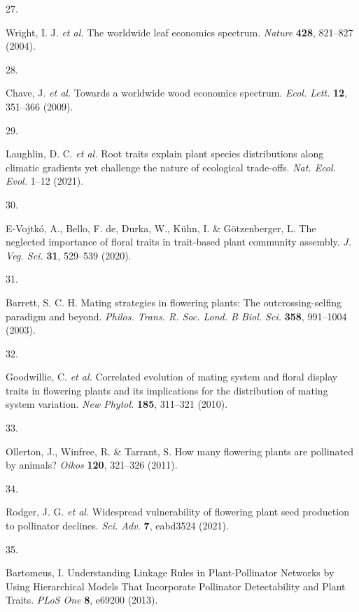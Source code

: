 \documentclass[
  12pt,
  a4paper,
]{article}
\newlength{\cslhangindent}
\newlength{\csllabelwidth}
\newlength{\cslentryspacingunit} %
\newenvironment{CSLReferences}[2] %
 {%
  \setlength{\parindent}{0pt}
  \ifodd #1
  \let\oldpar\par
  \def\par{\hangindent=\cslhangindent\oldpar}
  \fi
  \setlength{\parskip}{#2\cslentryspacingunit}
 }%
 {}
\newcommand{\CSLLeftMargin}[1]{\parbox[t]{\csllabelwidth}{#1}}
\newcommand{\CSLRightInline}[1]{\parbox[t]{\linewidth - \csllabelwidth}{#1}\break}
\begin{document}
\begin{CSLReferences}{0}{0}
\leavevmode{}%
\CSLLeftMargin{27. }
\CSLRightInline{Wright, I. J. \emph{et al.} The worldwide leaf economics spectrum. \emph{Nature} \textbf{428}, 821--827 (2004).}

\leavevmode{}%
\CSLLeftMargin{28. }
\CSLRightInline{Chave, J. \emph{et al.} Towards a worldwide wood economics spectrum. \emph{Ecol. Lett.} \textbf{12}, 351--366 (2009).}

\leavevmode{}%
\CSLLeftMargin{29. }
\CSLRightInline{Laughlin, D. C. \emph{et al.} Root traits explain plant species distributions along climatic gradients yet challenge the nature of ecological trade-offs. \emph{Nat. Ecol. Evol.} 1--12 (2021).}

\leavevmode{}%
\CSLLeftMargin{30. }
\CSLRightInline{E-Vojtkó, A., Bello, F. de, Durka, W., Kühn, I. \& Götzenberger, L. The neglected importance of floral traits in trait-based plant community assembly. \emph{J. Veg. Sci.} \textbf{31}, 529--539 (2020).}

\leavevmode{}%
\CSLLeftMargin{31. }
\CSLRightInline{Barrett, S. C. H. Mating strategies in flowering plants: The outcrossing-selfing paradigm and beyond. \emph{Philos. Trans. R. Soc. Lond. B Biol. Sci.} \textbf{358}, 991--1004 (2003).}

\leavevmode{}%
\CSLLeftMargin{32. }
\CSLRightInline{Goodwillie, C. \emph{et al.} Correlated evolution of mating system and floral display traits in flowering plants and its implications for the distribution of mating system variation. \emph{New Phytol.} \textbf{185}, 311--321 (2010).}

\leavevmode{}%
\CSLLeftMargin{33. }
\CSLRightInline{Ollerton, J., Winfree, R. \& Tarrant, S. How many flowering plants are pollinated by animals? \emph{Oikos} \textbf{120}, 321--326 (2011).}

\leavevmode{}%
\CSLLeftMargin{34. }
\CSLRightInline{Rodger, J. G. \emph{et al.} Widespread vulnerability of flowering plant seed production to pollinator declines. \emph{Sci. Adv.} \textbf{7}, eabd3524 (2021).}

\leavevmode{}%
\CSLLeftMargin{35. }
\CSLRightInline{Bartomeus, I. Understanding {Linkage Rules} in {Plant}-{Pollinator Networks} by {Using Hierarchical Models That Incorporate Pollinator Detectability} and {Plant Traits}. \emph{PLoS One} \textbf{8}, e69200 (2013).}


\end{CSLReferences}
\end{document}
